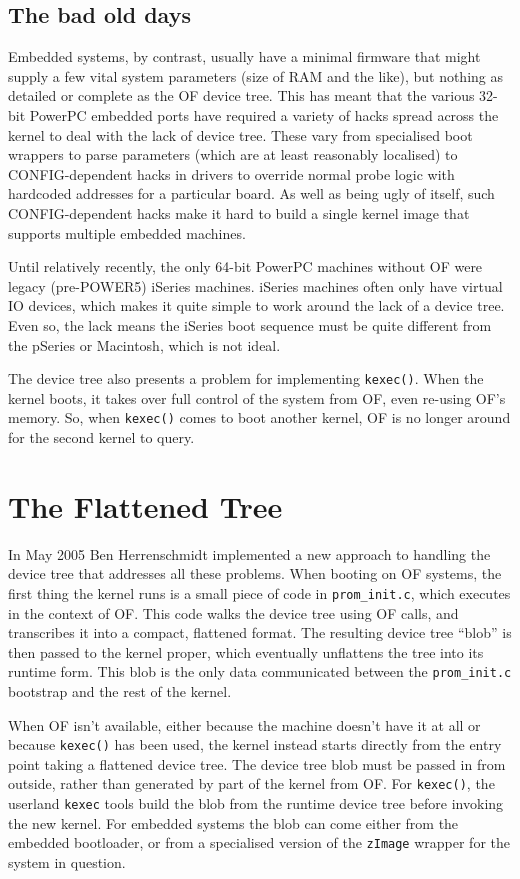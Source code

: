 \documentclass[a4paper,twocolumn]{article}
\newcommand{\R}{\textsuperscript{\textregistered}\xspace}
\newcommand{\ppc}{\mbox{PowerPC}\xspace}
\newcommand{\benh}{Ben Herrenschmidt\xspace}
\newcommand{\kexec}{\texttt{kexec()}\xspace}
\begin{document}
\subsection{The bad old days}

Embedded systems, by contrast, usually have a minimal firmware that
might supply a few vital system parameters (size of RAM and the like),
but nothing as detailed or complete as the OF device tree.  This has
meant that the various 32-bit \ppc embedded ports have required a
variety of hacks spread across the kernel to deal with the lack of
device tree.  These vary from specialised boot wrappers to parse
parameters (which are at least reasonably localised) to
CONFIG-dependent hacks in drivers to override normal probe logic with
hardcoded addresses for a particular board.  As well as being ugly of
itself, such CONFIG-dependent hacks make it hard to build a single
kernel image that supports multiple embedded machines.

Until relatively recently, the only 64-bit \ppc machines without OF
were legacy (pre-POWER5\R) iSeries\R machines.  iSeries machines often
only have virtual IO devices, which makes it quite simple to work
around the lack of a device tree.  Even so, the lack means the iSeries
boot sequence must be quite different from the pSeries or Macintosh,
which is not ideal.

The device tree also presents a problem for implementing \kexec.  When
the kernel boots, it takes over full control of the system from OF,
even re-using OF's memory.  So, when \kexec comes to boot another
kernel, OF is no longer around for the second kernel to query.

\section{The Flattened Tree}

In May 2005 \benh implemented a new approach to handling the device
tree that addresses all these problems.  When booting on OF systems,
the first thing the kernel runs is a small piece of code in
\texttt{prom\_init.c}, which executes in the context of OF.  This code
walks the device tree using OF calls, and transcribes it into a
compact, flattened format.  The resulting device tree ``blob'' is then
passed to the kernel proper, which eventually unflattens the tree into
its runtime form.  This blob is the only data communicated between the
\texttt{prom\_init.c} bootstrap and the rest of the kernel.

When OF isn't available, either because the machine doesn't have it at
all or because \kexec has been used, the kernel instead starts
directly from the entry point taking a flattened device tree.  The
device tree blob must be passed in from outside, rather than generated
by part of the kernel from OF.  For \kexec, the userland
\texttt{kexec} tools build the blob from the runtime device tree
before invoking the new kernel.  For embedded systems the blob can
come either from the embedded bootloader, or from a specialised
version of the \texttt{zImage} wrapper for the system in question.
\end{document}
